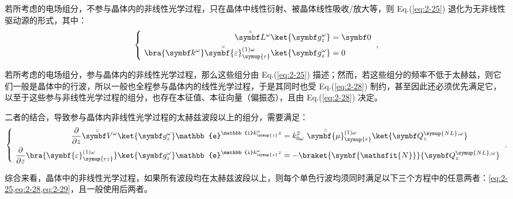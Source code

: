 若所考虑的电场组分，不参与晶体内的非线性光学过程，只在晶体中线性衍射、被晶体线性吸收/放大等，则 Eq.(\ref{eq:2-25}) 退化为无非线性驱动源的形式，其中：
\begin{equation} \label{eq:2-28}
	\left\{\ \begin{aligned} \bar{\bar{\symbf L}}^\omega \ket{\symbf g^{\omega}_z} &= \symbf 0 \\ \bra{\symbf k^\omega} \bar{\bar{\symbf{\varepsilon}}}_{\symup{r}}^{(1)\omega} \ket{\symbf g^{\omega}_z} &= 0 \end{aligned}\right. ~,
\end{equation}

若所考虑的电场组分，参与晶体内的非线性光学过程，那么这些组分由 Eq.(\ref{eq:2-25}) 描述；然而，若这些组分的频率不低于太赫兹，则它们一般是晶体中的行波，所以一般也全程参与晶体内的线性光学过程，于是其同时也受 Eq.(\ref{eq:2-28}) 制约，甚至因此还必须优先满足它，以至于这些参与非线性光学过程的组分，也存在本征值、本征向量（偏振态），且由 Eq.(\ref{eq:2-28}) 决定。

二者的结合，导致参与晶体内非线性光学过程的太赫兹波段以上的组分，需要满足：
\begin{equation} \label{eq:2-29}
	\left\{\ \begin{aligned} \displaystyle{\frac{\partial}{\partial z}} \bar{\bar{\symbf V}}^\omega \ket{\symbf g^{\omega}_z} \mathbb{e}^{\mathbb{i} k^\omega_{\symup{z}} z} &= k^{2}_{0\omega}\ \bar{\bar{\symbf{\mu}}}_{\symup{r}}^{(1)\omega} \ket{\symbf Q^{{\symup{NL}},\omega}_z} \\ \displaystyle{\frac{\partial}{\partial z}} \bra{\symbf{\varepsilon}_{\symup{rz}}^{(1)\omega}} \ket{\symbf g^{\omega}_z} \mathbb{e}^{\mathbb{i} k^\omega_{\symup{z}} z} &= -\braket{\symbf{\mathsfit{N}}}{\symbf Q^{{\symup{NL}},\omega}_z} \end{aligned}\right. ~.
\end{equation}

综合来看，晶体中的非线性光学过程，如果所有波段均在太赫兹波段以上，则每个单色行波均须同时满足以下三个方程中的任意两者：\cref{eq:2-25,eq:2-28,eq:2-29}，且一般使用后两者。

